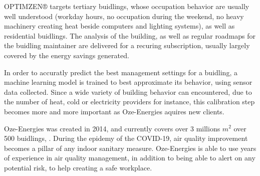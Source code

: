 \documentclass[12pt]{article}
\begin{document}
OPTIMZEN® targets tertiary buidlings, whose occupation behavior are usually well understood (workday hours, no occupation during the weekend, no heavy machinery creating heat beside computers and lighting systems), as well as residential buidlings. The analysis of the building, as well as regular roadmaps for the buidling maintainer are delivered for a recuring subscription, usually largely covered by the energy savings generated.

In order to accuratly predict the best management settings for a buidling, a machine learning model is trained to best approximate its behavior, using sensor data collected. Since a wide variety of building behavior can encountered, due to the number of heat, cold or electricity providers for instance, this calibration step becomes more and more important as Oze-Energies aquires new clients.

Oze-Energies was created in 2014, and currently covers over 3 millions $m^2$ over 500 buidlings, \cite{}. During the epidemy of the COVID-19, air quality improvement becomes a pillar of any indoor sanitary measure. Oze-Energies is able to use years of experience in air quality management, in addition to being able to alert on any potential risk, to help creating a safe workplace.
\end{document}
